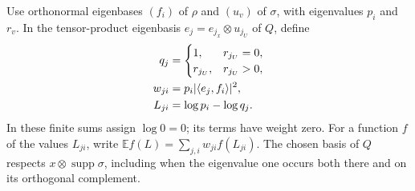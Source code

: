 Use orthonormal eigenbases $(f_i)$ of $\rho$ and $(u_v)$ of $\sigma$,
with eigenvalues $p_i$ and $r_v$. In the tensor-product eigenbasis
$e_j=e_{j_x}\otimes u_{j_U}$ of $Q$, define
\begin{align}
    q_j&=\begin{cases}1,&r_{j_U}=0,\\r_{j_U},&r_{j_U}>0,\end{cases}\notag\\
    w_{ji}&=p_i|\langle e_j,f_i\rangle|^2,\notag\\
    L_{ji}&=\log p_i-\log q_j.
    \label{eq:conditional_log_law}
\end{align}
In these finite sums assign $\log0=0$; its terms have weight zero.
For a function $f$ of the values $L_{ji}$, write
$\mathbb E f(L)=\sum_{j,i}w_{ji}f(L_{ji})$.
The chosen basis of $Q$ respects $x\otimes\operatorname{supp}\sigma$,
including when the eigenvalue one occurs both there and on its orthogonal
complement.

